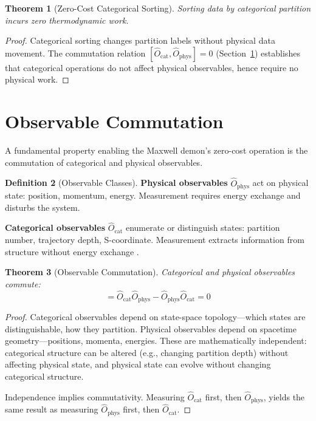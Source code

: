 \documentclass[10pt,twocolumn]{article}
\newtheorem{theorem}{Theorem}[section]
\theoremstyle{definition}
\newtheorem{definition}[theorem]{Definition}
\theoremstyle{remark}
\begin{document}
\begin{theorem}[Zero-Cost Categorical Sorting]
Sorting data by categorical partition incurs zero thermodynamic work.
\end{theorem}

\begin{proof}
Categorical sorting changes partition labels without physical data movement. The commutation relation $[\hat{O}_{\text{cat}}, \hat{O}_{\text{phys}}] = 0$ (Section~\ref{sec:commutation}) establishes that categorical operations do not affect physical observables, hence require no physical work.
\end{proof}

\section{Observable Commutation}
\label{sec:commutation}

A fundamental property enabling the Maxwell demon's zero-cost operation is the commutation of categorical and physical observables.

\begin{definition}[Observable Classes]
\textbf{Physical observables} $\hat{O}_{\text{phys}}$ act on physical state: position, momentum, energy. Measurement requires energy exchange and disturbs the system.

\textbf{Categorical observables} $\hat{O}_{\text{cat}}$ enumerate or distinguish states: partition number, trajectory depth, S-coordinate. Measurement extracts information from structure without energy exchange \cite{jaynes1957,cover2006}.
\end{definition}

\begin{theorem}[Observable Commutation]
\label{thm:commutation}
Categorical and physical observables commute:
\begin{equation}
[\hat{O}_{\text{cat}}, \hat{O}_{\text{phys}}] = \hat{O}_{\text{cat}} \hat{O}_{\text{phys}} - \hat{O}_{\text{phys}} \hat{O}_{\text{cat}} = 0
\end{equation}
\end{theorem}

\begin{proof}
Categorical observables depend on state-space topology---which states are distinguishable, how they partition. Physical observables depend on spacetime geometry---positions, momenta, energies. These are mathematically independent: categorical structure can be altered (e.g., changing partition depth) without affecting physical state, and physical state can evolve without changing categorical structure.

Independence implies commutativity. Measuring $\hat{O}_{\text{cat}}$ first, then $\hat{O}_{\text{phys}}$, yields the same result as measuring $\hat{O}_{\text{phys}}$ first, then $\hat{O}_{\text{cat}}$.
\end{proof}
\end{document}
